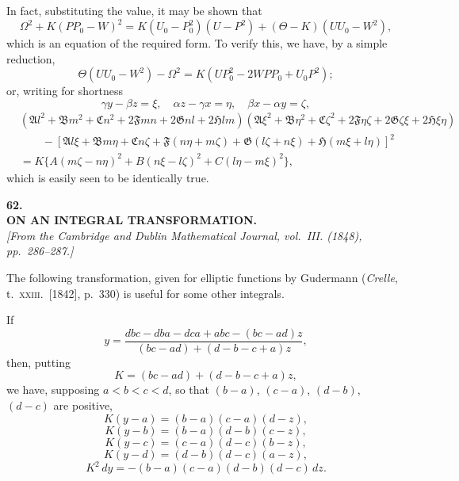 \documentclass[11pt]{article}
\begin{document}
In fact, substituting the value, it may be shown that
\[
\Omega^{2} + K(PP_{0} - W)^{2} = K(U_{0} - P_{0}^{2})(U - P^{2}) + (\Theta - K)(UU_{0} - W^{2}),
\]
which is an equation of the required form. To verify this, we have, by a simple
reduction,
\[
\Theta(UU_{0} - W^{2}) - \Omega^{2} = K(UP_{0}^{2} - 2WPP_{0} + U_{0}P^{2});
\]
or, writing for shortness
\[
\gamma y - \beta z = \xi,\quad \alpha z - \gamma x = \eta,\quad \beta x - \alpha y = \zeta,
\]
\begin{align*}
&(\mathfrak{A}l^{2} + \mathfrak{B}m^{2} + \mathfrak{C}n^{2} + 2\mathfrak{F}mn + 2\mathfrak{G}nl + 2\mathfrak{H}lm)
(\mathfrak{A}\xi^{2} + \mathfrak{B}\eta^{2} + \mathfrak{C}\zeta^{2} + 2\mathfrak{F}\eta\zeta + 2\mathfrak{G}\zeta\xi + 2\mathfrak{H}\xi\eta)\\
&\qquad - [\mathfrak{A}l\xi + \mathfrak{B}m\eta + \mathfrak{C}n\zeta + \mathfrak{F}(n\eta + m\zeta) + \mathfrak{G}(l\zeta + n\xi) + \mathfrak{H}(m\xi + l\eta)]^{2}\\
&= K\{A(m\zeta - n\eta)^{2} + B(n\xi - l\zeta)^{2} + C(l\eta - m\xi)^{2}\},
\end{align*}
which is easily seen to be identically true.

\bigskip

\begin{center}
\textbf{\large 62.}\\[0.7em]
\textbf{\large ON AN INTEGRAL TRANSFORMATION.}\\[0.5em]
\textit{[From the Cambridge and Dublin Mathematical Journal, vol.~III. (1848), pp.~286--287.]}
\end{center}

\medskip

The following transformation, given for elliptic functions by Gudermann (\textit{Crelle},
t.~\textsc{xxiii}.\ [1842], p.~330) is useful for some other integrals.

\medskip
If
\[
y = \frac{dbc - dba - dca + abc - (bc - ad)z}{(bc - ad) + (d - b - c + a)z},
\]
then, putting
\[
K = (bc - ad) + (d - b - c + a)z,
\]
we have, supposing $a < b < c < d$, so that $(b - a)$, $(c - a)$, $(d - b)$, $(d - c)$ are positive,
\[
K(y - a) = (b - a)(c - a)(d - z),
\]
\[
K(y - b) = (b - a)(d - b)(c - z),
\]
\[
K(y - c) = (c - a)(d - c)(b - z),
\]
\[
K(y - d) = (d - b)(d - c)(a - z),
\]
\[
K^{2}\,dy = -(b - a)(c - a)(d - b)(d - c)\,dz.
\]
\end{document}
